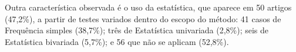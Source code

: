 Outra característica observada é o uso da estatística, que aparece em 50
artigos (47,2\%), a partir de testes variados dentro do escopo do
método: 41 casos de Frequência simples (38,7\%); três de Estatística univariada (2,8\%); seis de Estatística bivariada (5,7\%); e 56 que não se aplicam (52,8\%).

